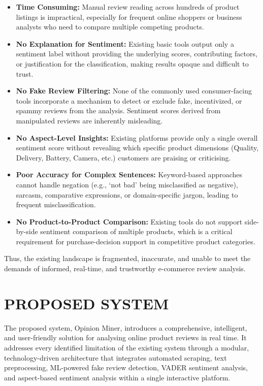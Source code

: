 \documentclass[12pt,a4paper]{report}
\begin{document}
\begin{itemize}
  \item \textbf{Time Consuming:} Manual review reading across hundreds of product listings is impractical, especially for frequent online shoppers or business analysts who need to compare multiple competing products.

  \item \textbf{No Explanation for Sentiment:} Existing basic tools output only a sentiment label without providing the underlying scores, contributing factors, or justification for the classification, making results opaque and difficult to trust.

  \item \textbf{No Fake Review Filtering:} None of the commonly used consumer-facing tools incorporate a mechanism to detect or exclude fake, incentivized, or spammy reviews from the analysis. Sentiment scores derived from manipulated reviews are inherently misleading.

  \item \textbf{No Aspect-Level Insights:} Existing platforms provide only a single overall sentiment score without revealing which specific product dimensions (Quality, Delivery, Battery, Camera, etc.) customers are praising or criticising.

  \item \textbf{Poor Accuracy for Complex Sentences:} Keyword-based approaches cannot handle negation (e.g., `not bad' being misclassified as negative), sarcasm, comparative expressions, or domain-specific jargon, leading to frequent misclassification.

  \item \textbf{No Product-to-Product Comparison:} Existing tools do not support side-by-side sentiment comparison of multiple products, which is a critical requirement for purchase-decision support in competitive product categories.
\end{itemize}

Thus, the existing landscape is fragmented, inaccurate, and unable to meet the demands of informed, real-time, and trustworthy e-commerce review analysis.

\section{PROPOSED SYSTEM}

The proposed system, Opinion Miner, introduces a comprehensive, intelligent, and user-friendly solution for analysing online product reviews in real time. It addresses every identified limitation of the existing system through a modular, technology-driven architecture that integrates automated scraping, text preprocessing, ML-powered fake review detection, VADER sentiment analysis, and aspect-based sentiment analysis within a single interactive platform.
\end{document}
